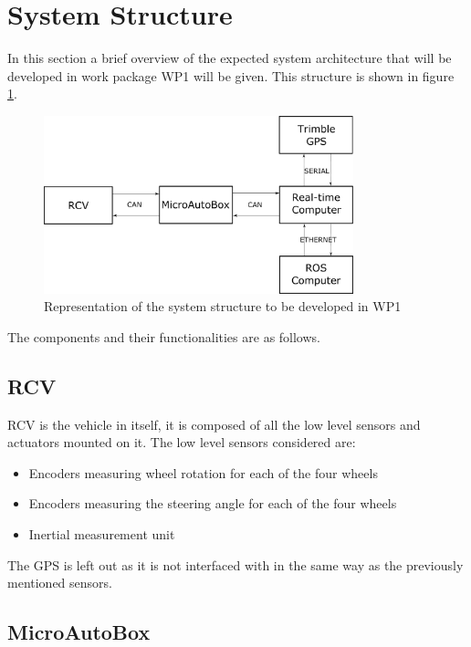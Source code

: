 \section{System Structure}

\label{sec:system_structure_appendix}

In this section a brief overview of the expected system architecture that will be developed in work package WP1 will be given. This structure is shown in figure \ref{fig:system_structure}.

\begin{figure}[h!]
  \centering
    \includegraphics[width=0.8\textwidth]{SystemStructureWithCommunicationProtocols}
    \caption{Representation of the system structure to be developed in WP1 \label{fig:system_structure} }
\end{figure}

The components and their functionalities are as follows.

\subsection{RCV} 

RCV is the vehicle in itself, it is composed of all the low level sensors and actuators mounted on it. The low level sensors considered are:

\begin{itemize}
\item Encoders measuring wheel rotation for each of the four wheels
\item Encoders measuring the steering angle for each of the four wheels
\item Inertial measurement unit
\end{itemize}

The GPS is left out as it is not interfaced with in the same way as the previously mentioned sensors.

\subsection{MicroAutoBox}

